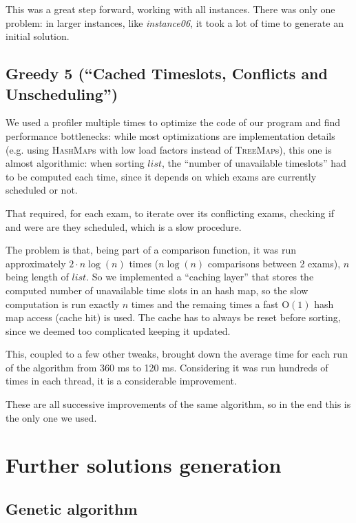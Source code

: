 \documentclass[11pt, a4paper, leqno]{article}
\begin{document}
	 This was a great step forward, working with all instances. There was only one problem: in larger instances, like \textit{instance06}, it took a lot of time to generate an initial solution.
	
	\subsection{Greedy 5 (``Cached Timeslots, Conflicts and Unscheduling'')}
	
	We used a profiler multiple times to optimize the code of our program and find performance bottlenecks: while most optimizations are implementation details (e.g. using \textsc{HashMap}s with low load factors instead of \textsc{TreeMap}s), this one is almost algorithmic: when sorting $list$, the ``number of unavailable timeslots'' had to be computed each time, since it depends on which exams are currently scheduled or not.
	
	That required, for each exam, to iterate over its conflicting exams, checking if and were are they scheduled, which is a slow procedure.
	
	The problem is that, being part of a comparison function, it was run approximately $2\cdot n \log(n)$ times ($n \log(n)$ comparisons between 2 exams), $n$ being length of $list$. So we implemented a ``caching layer'' that stores the computed number of unavailable time slots in an hash map, so the slow computation is run exactly $n$ times and the remaing times a fast $\mathrm{O}(1)$ hash map access (cache hit) is used. The cache has to always be reset before sorting, since we deemed too complicated keeping it updated.
	
	This, coupled to a few other tweaks, brought down the average time for each run of the algorithm from 360 ms to 120 ms. Considering it was run hundreds of times in each thread, it is a considerable improvement.
	
	These are all successive improvements of the same algorithm, so in the end this is the only one we used.
	
	\section{Further solutions generation}
	
	\subsection{Genetic algorithm}
	
\end{document}
